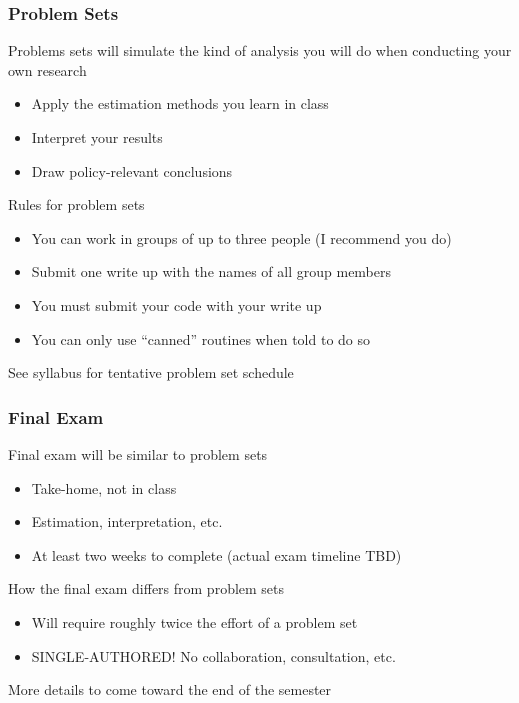 \documentclass{beamer}
\begin{document}
\begin{frame}\frametitle{Problem Sets}
    Problems sets will simulate the kind of analysis you will do when conducting your own research
    \begin{itemize}
        \item Apply the estimation methods you learn in class
        \item Interpret your results
        \item Draw policy-relevant conclusions
    \end{itemize}
    \vspace{2ex}
    Rules for problem sets
    \begin{itemize}
        \item You can work in groups of up to three people (I recommend you do)
        \item Submit one write up with the names of all group members
        \item You must submit your code with your write up
        \item You can only use ``canned'' routines when told to do so
    \end{itemize}
    \vspace{2ex}
    See syllabus for tentative problem set schedule
\end{frame}

\begin{frame}\frametitle{Final Exam}
    Final exam will be similar to problem sets
    \begin{itemize}
        \item Take-home, not in class
        \item Estimation, interpretation, etc.
        \item At least two weeks to complete (actual exam timeline TBD)
    \end{itemize}
    \vspace{2ex}
    How the final exam differs from problem sets
    \begin{itemize}
        \item Will require roughly twice the effort of a problem set
        \item SINGLE-AUTHORED! No collaboration, consultation, etc.
    \end{itemize}
    \vspace{2ex}
    More details to come toward the end of the semester
\end{frame}
\end{document}
